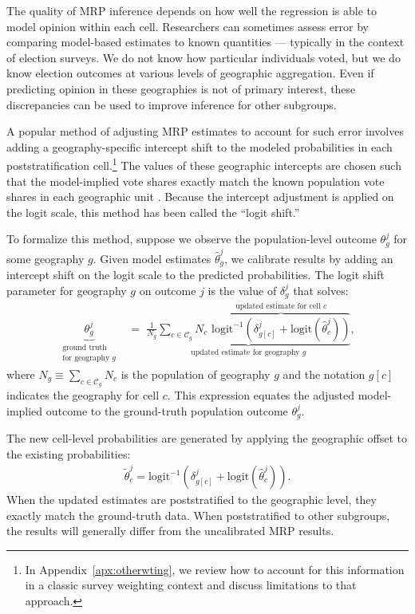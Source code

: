 
The quality of MRP inference depends on how well the regression is able to model opinion within each cell.
Researchers can sometimes assess error by comparing model-based estimates to known quantities --- typically in the context of election surveys.
We do not know how particular individuals voted, but we do know election outcomes at various levels of geographic aggregation. 
Even if predicting opinion in these geographies is not of primary interest, these discrepancies can be used to  improve inference for other subgroups. 

A popular method of adjusting MRP estimates to account for such error involves adding a geography-specific intercept shift to the modeled probabilities in each poststratification cell.\footnote{In Appendix~\ref{apx:otherwting}, we review how to account for this information in a classic survey weighting context and discuss limitations to that approach.}  
The values of these geographic intercepts are chosen such that the model-implied vote shares exactly match the known population vote shares in each geographic unit \citep[769]{GG:2013}.
Because the intercept adjustment is applied on the logit scale, this method has been called the ``logit shift.''

To formalize this method, suppose we observe the population-level outcome $\theta_g^j$ for some geography $g$. 
Given model estimates $\hat{\theta}_g^j$, we calibrate results by adding an intercept shift on the logit scale to the predicted probabilities.
The logit shift parameter for geography $g$ on outcome $j$ is the value of $\delta_g^j$ that solves:
\begin{align}
	\underbrace{\theta_g^j}_{\substack{\text{ground truth} \\ \text{for geography $g$}}} &= \,\, \underbrace{\frac{1}{N_g} \sum_{c \in \mathcal{C}_g} N_c \,\, \overbrace{\text{logit}^{-1}\left(\delta_{g[c]}^j + \text{logit}(\hat{\theta}_c^j) \right)}^{\text{updated estimate for cell $c$}}}_{\text{updated estimate for geography $g$}}, \label{eq:logitshift}
\end{align}
where $N_g \equiv \sum_{c \in \mathcal{C}_g} N_c$ is the population of geography $g$ and the notation $g[c]$ indicates the geography for cell $c$.
This expression equates the adjusted model-implied outcome to the ground-truth population outcome $\theta_g^j$. 

The new cell-level probabilities are generated by applying the geographic offset to the existing probabilities: 
\begin{align}
	\tilde{\theta}_c^j = \text{logit}^{-1}\left( \delta_{g[c]}^j + \text{logit}(\hat{\theta}_c^j)\right). \label{eq:updatedprobs}
\end{align}
When the updated estimates are poststratified to the geographic level, they exactly match the ground-truth data. 
When poststratified to other subgroups, the results will generally differ from the uncalibrated MRP results.

